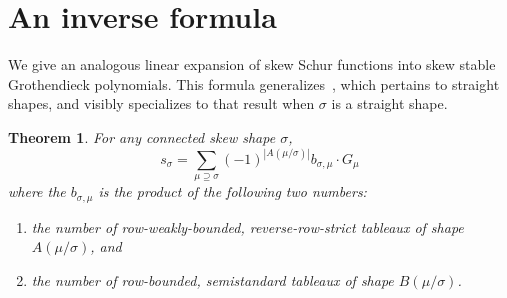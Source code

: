 \documentclass[11pt]{article}
\newtheorem{theorem}{Theorem}[section]
\theoremstyle{definition}
\begin{document}
\section{An inverse formula}



We give an analogous linear expansion of skew Schur functions into skew stable Grothendieck polynomials. This formula generalizes~\cite[Theorem~2.7]{lenart-combinatorial}, which pertains to straight shapes, and visibly specializes to that result when $\sigma$ is a straight shape. 

\begin{theorem}\label{t:back}
For any connected skew shape $\sigma$, 
\begin{equation}\label{eq:gsigma-conj}
s_\sigma = \sum_{\mu\supseteq \sigma} (-1)^{|A(\mu/\sigma)|} b_{\sigma,\mu} \cdot G_\mu
\end{equation}
where the $b_{\sigma, \mu}$ is the product of the following two numbers:
\begin{enumerate}
\item the number of row-weakly-bounded, reverse-row-strict tableaux of shape $A( \mu/\sigma)$, and 
\item the number of row-bounded, semistandard tableaux of shape $B(\mu/\sigma)$.
\end{enumerate}
\end{theorem}
\end{document}

